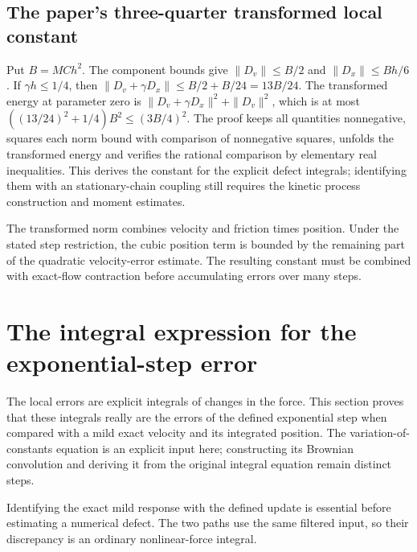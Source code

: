 \documentclass[11pt,a4paper]{report}
\begin{document}
\subsection{\texorpdfstring{The paper’s three-quarter transformed local constant}{The paper’s three-quarter transformed local constant}}
\label{report-step-KineticLangevin-LocalError-lean-5}


Put \(B=MCh^2\). The component bounds give \(\|D_v\|\le B/2\) and \(\|D_x\|\le Bh/6\). If \(\gamma h\le1/4\), then \(\|D_v+\gamma D_x\|\le B/2+B/24=13B/24\). The transformed energy at parameter zero is \(\|D_v+\gamma D_x\|^2+\|D_v\|^2\), which is at most \(((13/24)^2+1/4)B^2\le(3B/4)^2\). The proof keeps all quantities nonnegative, squares each norm bound with comparison of nonnegative squares, unfolds the transformed energy and verifies the rational comparison by elementary real inequalities. This derives the constant for the explicit defect integrals; identifying them with an stationary-chain coupling still requires the kinetic process construction and moment estimates.



The transformed norm combines velocity and friction times position. Under the stated step restriction, the cubic position term is bounded by the remaining part of the quadratic velocity-error estimate. The resulting constant must be combined with exact-flow contraction before accumulating errors over many steps.

\section{\texorpdfstring{The integral expression for the exponential-step error}{The integral expression for the exponential-step error}}
\label{proof-module-KineticLangevin-MildError-lean}


The local errors are explicit integrals of changes in the force. This section proves that these integrals really are the errors of the defined exponential step when compared with a mild exact velocity and its integrated position. The variation-of-constants equation is an explicit input here; constructing its Brownian convolution and deriving it from the original integral equation remain distinct steps.



Identifying the exact mild response with the defined update is essential before estimating a numerical defect. The two paths use the same filtered input, so their discrepancy is an ordinary nonlinear-force integral.
\end{document}
